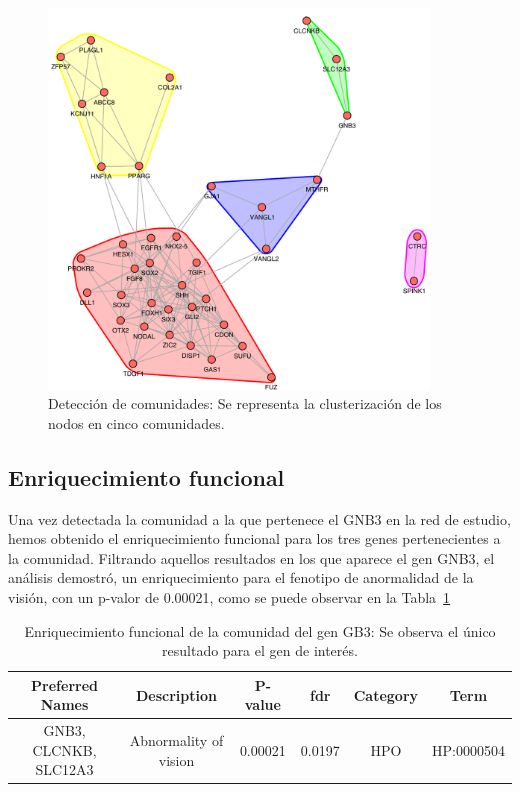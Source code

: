 \begin{figure}[h!]
	\includegraphics[width=0.9\textwidth]{figures/comunidades.pdf}
	\caption{Detección de comunidades: Se representa la clusterización de los nodos en cinco comunidades.}
	\label{fig:comunidad}
\end{figure}

\subsection{Enriquecimiento funcional}

Una vez detectada la comunidad a la que pertenece el GNB3 en la red de estudio, hemos obtenido el enriquecimiento funcional para los tres genes pertenecientes a la comunidad.  Filtrando aquellos resultados en los que aparece el gen GNB3, el análisis demostró, un enriquecimiento para el fenotipo de anormalidad de la visión, con un p-valor de 0.00021, como se puede observar en la Tabla~\ref{table:enriquecimiento1}

\begin{table}[h]
	\centering
	\begin{tabular}{|c|c|c|c|c|c|}
		\hline
		Preferred Names & Description & P-value & fdr & Category & Term \\ \hline
		GNB3, CLCNKB, SLC12A3 & Abnormality of vision    & 0.00021 & 0.0197&  HPO & HP:0000504 \\ \hline

	\end{tabular}
	\caption{Enriquecimiento funcional de la comunidad del gen GB3: Se observa el único resultado para el gen de interés.}
	\label{table:enriquecimiento1}
\end{table}


